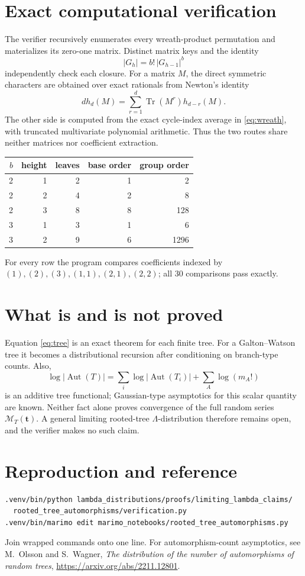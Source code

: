 \documentclass[11pt]{article}
\newcommand{\MGF}{\mathcal M}
\begin{document}
\section{Exact computational verification}
The verifier recursively enumerates every wreath-product permutation and
materializes its zero-one matrix.  Distinct matrix keys and the identity
\[
|G_h|=b!\,|G_{h-1}|^b
\]
independently check each closure.  For a matrix $M$, the direct symmetric
characters are obtained over exact rationals from Newton's identity
\[
d h_d(M)=\sum_{r=1}^d\operatorname{Tr}(M^r)h_{d-r}(M).
\]
The other side is computed from the exact cycle-index average in
\eqref{eq:wreath}, with truncated multivariate polynomial arithmetic.  Thus
the two routes share neither matrices nor coefficient extraction.

\begin{center}
\begin{tabular}{@{}rrrrr@{}}\toprule
$b$&height&leaves&base order&group order\\\midrule
2&1&2&1&2\\
2&2&4&2&8\\
2&3&8&8&128\\
3&1&3&1&6\\
3&2&9&6&1296\\\bottomrule
\end{tabular}
\end{center}
For every row the program compares coefficients indexed by
$(1),(2),(3),(1,1),(2,1),(2,2)$; all 30 comparisons pass exactly.

\section{What is and is not proved}
Equation \eqref{eq:tree} is an exact theorem for each finite tree.  For a
Galton--Watson tree it becomes a distributional recursion after conditioning
on branch-type counts.  Also,
\[
\log|\operatorname{Aut}(T)|=\sum_i\log|\operatorname{Aut}(T_i)|
+\sum_A\log(m_A!)
\]
is an additive tree functional; Gaussian-type asymptotics for this scalar
quantity are known.  Neither fact alone proves convergence of the full random
series $\MGF_T(\mathbf t)$.  A general limiting rooted-tree
$\Lambda$-distribution therefore remains open, and the verifier makes no such
claim.

\section{Reproduction and reference}
\begin{verbatim}
.venv/bin/python lambda_distributions/proofs/limiting_lambda_claims/
  rooted_tree_automorphisms/verification.py
.venv/bin/marimo edit marimo_notebooks/rooted_tree_automorphisms.py
\end{verbatim}
Join wrapped commands onto one line.  For automorphism-count asymptotics, see
M.~Olsson and S.~Wagner, \emph{The distribution of the number of
automorphisms of random trees},
\url{https://arxiv.org/abs/2211.12801}.
\end{document}
